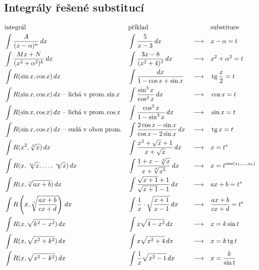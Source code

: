 \subsection*{Integrály řešené substitucí}
\begin{align*}
    &\textrm{integrál}                                & & \textrm{příklad}                                       & &                 & & \textrm{substituce}\\
    &\int \frac{A}{(x-\alpha)^n}\, dx                 & & \int \frac{5}{x-3}\, dx                                & & \longrightarrow & & x-\alpha=t \\
    &\int \frac{Mx+N}{(x^2+\alpha^2)^k}\, dx          & & \int \frac{3x-8}{(x^2+4)^3}\, dx                       & & \longrightarrow & & x^2+\alpha^2=t \\
    &\int R(\sin x, \cos x)\, dx                      & & \int \frac{dx}{1-\cos x+\sin x}                        & & \longrightarrow & & \operatorname{tg} \frac{x}{2}=t \\
    &\int R(\sin x, \cos x)\, dx \textrm{ -- lichá v prom.}\sin x                                               & & \int \frac{\sin^3 x}{\cos^2 x}\, dx                    & & \longrightarrow & & \cos x = t \\
    &\int R(\sin x, \cos x)\, dx \textrm{ -- lichá v prom.}\cos x                                               & & \int \frac{\cos^3 x}{1-\sin^3 x}\, dx                  & & \longrightarrow & & \sin x = t \\
    &\int R(\sin x, \cos x)\, dx \textrm{ -- sudá v obou prom.} & & \int \frac{2\cos x - \sin x}{\cos x - 2\sin x} \, dx   & & \longrightarrow & & \operatorname{tg} x = t \\
    &\int R(x^2,\sqrt[3]{x})\, dx                     & & \int \frac{x^2+\sqrt{x}+1}{x+\sqrt{x}}\, dx            & & \longrightarrow & & x=t^s \\
    &\int R(x,\sqrt[s_1]{x},\dots,\sqrt[s_k]{x})\, dx & & \int \frac{1+x-\sqrt[3]{x}}{x+\sqrt[6]{x^5}}\, dx      & & \longrightarrow & & x=t^{\textrm{nsn}(s_1,\dots,s_k)}\\
    &\int R(x,\sqrt[s]{ax+b})\, dx                    & & \int \frac{\sqrt{x+1}+1}{\sqrt{x+1}-1} \, dx           & & \longrightarrow & & ax+b=t^s \\
    &\int R\left(x,\sqrt[s]{\frac{ax+b}{cx+d}}\right)\, dx       & & \int \frac{1}{x}\cdot \sqrt{\frac{x+1}{x-1}} \, dx     & & \longrightarrow & & \frac{ax+b}{cx+d}=t^s \\
    &\int R(x,\sqrt{k^2-x^2}) \, dx                   & & \int x \sqrt{4-x^2}\, dx                               & & \longrightarrow & & x=k\sin t \\
    &\int R(x,\sqrt{x^2+k^2})\, dx                    & & \int x \sqrt{x^2+4} \, dx                              & & \longrightarrow & & x=k\operatorname{tg} t \\
    &\int R(x,\sqrt{x^2-k^2} )\, dx                   & & \int \frac{1}{x}\sqrt{x^2-1}\, dx                      & & \longrightarrow & & x=\frac{k}{\sin t}
\end{align*}

